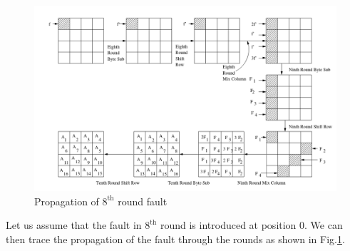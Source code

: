 \documentclass[12pt,a4paper,english]{paper}
\begin{document}
\begin{figure}[H]
    \centering
    \includegraphics[scale=0.4]{FaultProp.png}
    \caption{Propagation of $8^{\text{th}}$ round fault \cite{10.1007/978-3-642-21040-2_15}}
    \label{fig:fault_prop}
\end{figure}

Let us assume that the fault in $8^{\text{th}}$ round is introduced at position 0. We can then trace the propagation of the fault through the rounds as shown in Fig.\ref{fig:fault_prop}.
\end{document}

